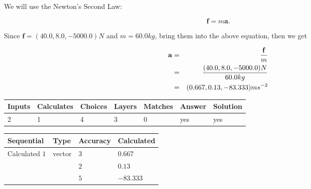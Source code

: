 \documentclass[12pt]{article}
\begin{document}
 
 
 
 
\noindent{}
 
 

We will use the Newton's Second Law:
 
\[
\mathbf{f}=m\mathbf{a}.
\]
 
Since $\mathbf{f}= %
(40.0 , 8.0 , -5000.0) N$
and $m= %
60.0kg$, bring them into the above equation, then we get
 
\begin{eqnarray*}
\mathbf{a}&=&\frac{\mathbf{f}}m  \\
&=&\frac{ %
(40.0 , 8.0 , -5000.0) N}{ %
60.0kg}  \\
&=& %
(0.667 , 0.13 , -83.333) ms^{-2}
\end{eqnarray*}
 
 
 
\noindent{}
 
 

 
 
\vspace{0.3in}
   
   
   
   
\noindent\begin{tabular}{|l|l|l|l|l|l|l|}
 \hline
Inputs & Calculates & Choices & Layers & Matches & Answer & Solution \\ \hline
           2  & 
           1  & 
           4
  & 
           3  & 
           0  & 
  yes & 
  yes 
  \\ \hline
 \end{tabular}
   
   
   
   
\noindent{}
   
   
  
  
\noindent\begin{tabular}{|l|l|l|l|}
\hline
 Sequential & Type & Accuracy & Calculated \\ 
\hline
 
 
  Calculated $            1 $ & vector &  
  $            3  $ 
 &  $ 0.667 $ 
 \\    
  & & 
  $            2  $ 
 &  $ 0.13 $ 
 \\    
  & & 
  $            5  $ 
 &  $ -83.333 $ 
 \\  \hline  
 \end{tabular}
   
\end{document}
